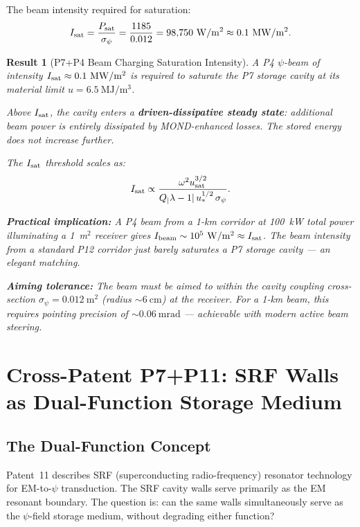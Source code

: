 \documentclass[aps,prd,twocolumn,superscriptaddress]{revtex4-2}
\newcommand{\lam}{|\lambda-1|}
\newtheorem{result}{Result}
\begin{document}
The beam intensity required for saturation:
\begin{equation}
I_{\rm sat} = \frac{P_{\rm sat}}{\sigma_\psi}
= \frac{1185}{0.012} = 98{,}750~\mathrm{W/m^2} \approx 0.1~\mathrm{MW/m^2}.
\end{equation}

\begin{result}[P7+P4 Beam Charging Saturation Intensity]
A P4 $\psi$-beam of intensity $I_{\rm sat} \approx 0.1~\mathrm{MW/m^2}$
is required to saturate the P7 storage cavity at its material limit
$u = 6.5~\mathrm{MJ/m^3}$.

Above $I_{\rm sat}$, the cavity enters a \textbf{driven-dissipative
steady state}: additional beam power is entirely dissipated by
MOND-enhanced losses.  The stored energy does not increase further.

The $I_{\rm sat}$ threshold scales as:
\begin{equation}
I_{\rm sat} \propto \frac{\omega^2 u_{\rm sat}^{3/2}}{Q_\lam\,u_*^{1/2}\,\sigma_\psi}.
\end{equation}

\textbf{Practical implication:} A P4 beam from a 1-km corridor at
100~kW total power illuminating a 1~m$^2$ receiver gives
$I_{\rm beam} \sim 10^5~\mathrm{W/m^2} \approx I_{\rm sat}$.
The beam intensity from a standard P12 corridor just barely saturates
a P7 storage cavity --- an elegant matching.

\textbf{Aiming tolerance:} The beam must be aimed to within the cavity
coupling cross-section $\sigma_\psi = 0.012~\mathrm{m^2}$ (radius
$\sim 6~\mathrm{cm}$) at the receiver.  For a 1-km beam, this requires
pointing precision of $\sim 0.06~\mathrm{mrad}$ --- achievable with
modern active beam steering.
\end{result}

\section{Cross-Patent P7+P11: SRF Walls as Dual-Function Storage Medium}
\label{sec:p7p11}

\subsection{The Dual-Function Concept}

Patent~11 describes SRF (superconducting radio-frequency) resonator
technology for EM-to-$\psi$ transduction.  The SRF cavity walls serve
primarily as the EM resonant boundary.  The question is: can the same
walls simultaneously serve as the $\psi$-field storage medium, without
degrading either function?
\end{document}

